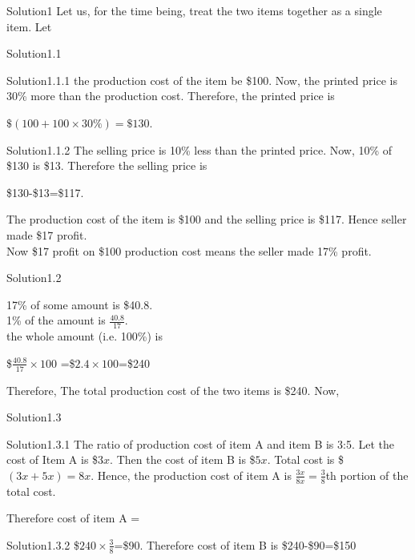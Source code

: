 \documentclass[titlepage]{article}
\begin{document}
\begin{section}{Solution1}
Let us, for the time being, treat the two items together as a single item. Let 
\begin{subsection}{Solution1.1}
\begin{subsubsection}{Solution1.1.1}
the production cost of the item be \$100. Now, the printed price is 30\% more than the production cost. Therefore, the printed price is  
\begin{center}
$\$(100+100\times30\%)=\$130$.
\end{center}
\end{subsubsection}
\begin{subsubsection}{Solution1.1.2}
The selling price is 10\% less than the printed price. Now, 10\% of \$130 is \$13. Therefore the selling price is 
\begin{center}
\$130-\$13=\$117.
\end{center}
\end{subsubsection}
The production cost of the item is \$100 and the selling price is \$117. Hence seller made \$17 profit. \\
Now \$17 profit on \$100 production cost means the seller made 17\% profit.
\end{subsection}
\begin{subsection}{Solution1.2}

 17\% of some amount is \$40.8.\\
 1\% of the amount is $\frac{40.8}{17}.$\\
the whole amount (i.e. 100\%) is 
\begin{center}
\$$\frac{40.8}{17}\times100$ =\$$2.4\times100$=\$240
\end{center}
\end{subsection}
Therefore, The total production cost of the two items is \$240. Now,
\begin{subsection}{Solution1.3}
\begin{subsubsection}{Solution1.3.1}
The ratio of production cost of item A and item B is 3:5. Let the cost of Item A is \$$3x$. Then the cost of item B is \$$5x$. Total cost is \$$(3x+5x)=8x$. Hence, the production cost of item A is $\frac{3x}{8x}=\frac{3}{8}$th portion of the total cost.\\
\end{subsubsection}
Therefore cost of item A = 
\begin{subsubsection}{Solution1.3.2}
\$$240\times\frac{3}{8}$=\$90.
Therefore cost of item B is \$240-\$90=\$150
\end{subsubsection}
\end{subsection}
\end{section}
\end{document}
